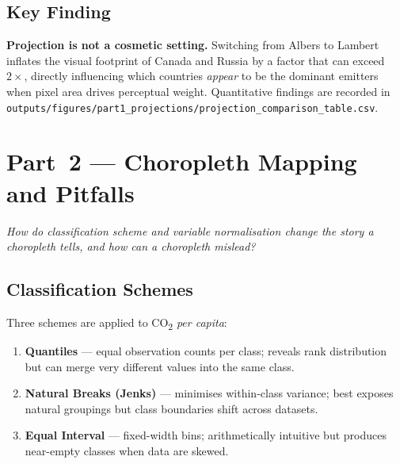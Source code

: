 \documentclass[12pt, a4paper, oneside]{report}
\begin{document}
\section{Key Finding}

\begin{designbox}
\textbf{Projection is not a cosmetic setting.} Switching from Albers to Lambert inflates
the visual footprint of Canada and Russia by a factor that can exceed $2\times$, directly
influencing which countries \emph{appear} to be the dominant emitters when pixel area
drives perceptual weight. Quantitative findings are recorded in\\
\texttt{outputs/figures/part1\_projections/projection\_comparison\_table.csv}.
\end{designbox}

\chapter{Part~2 --- Choropleth Mapping and Pitfalls}

\begin{infobox}
\textit{How do classification scheme and variable normalisation change the story a choropleth
tells, and how can a choropleth mislead?}
\end{infobox}

\section{Classification Schemes}

Three schemes are applied to CO\textsubscript{2} \emph{per capita}:

\begin{enumerate}[leftmargin=2em, label=\textcolor{accent}{\bfseries\arabic*.}]
  \item \textbf{Quantiles} --- equal observation counts per class; reveals rank
        distribution but can merge very different values into the same class.
  \item \textbf{Natural Breaks (Jenks)} --- minimises within-class variance; best
        exposes natural groupings but class boundaries shift across datasets.
  \item \textbf{Equal Interval} --- fixed-width bins; arithmetically intuitive but
        produces near-empty classes when data are skewed.
\end{enumerate}
\end{document}
